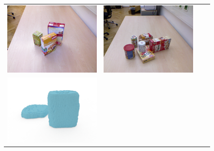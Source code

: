 \documentclass[10pt,twocolumn,letterpaper]{article}
\begin{document}
\begin{figure}
\begin{tabular}{cccc}
    \includegraphics[width=\scenewidth]{scene/image_color/learn13} &
    \includegraphics[width=\scenewidth]{scene/image_color/test45} \\
    \includegraphics[width=\scenewidth]{scene/cropped/learn12_op_0} &

\end{tabular}
\end{figure}
\end{document}
